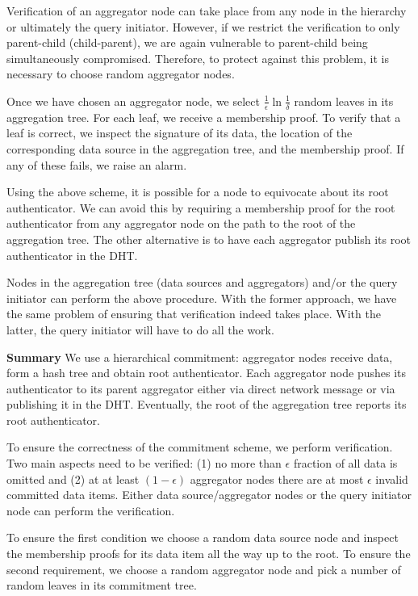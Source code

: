 \documentclass{article}
\begin{document}
Verification of an aggregator node can take place from any node
in the hierarchy or ultimately the query initiator. However, if
we restrict the verification to only parent-child (child-parent), we are again
vulnerable to parent-child being simultaneously
compromised. Therefore, to protect against this problem, it is
necessary to choose random aggregator nodes. 

Once we have chosen an aggregator node, we select
$\frac{1}{\epsilon}\ln{\frac{1}{\delta}}$ random leaves in its
aggregation tree. For each leaf, we receive a membership proof. To
verify that a leaf is correct, we inspect the signature of its data,
the location of the corresponding data source in the aggregation tree,
and the membership proof. If any of these fails, we raise an alarm.

Using the above scheme, it is possible for a node to equivocate about
its root authenticator. We can avoid this by requiring a membership
proof for the root authenticator from any aggregator node on the path
to the root of the aggregation tree. The other alternative is to have
each aggregator publish its root authenticator in the DHT.


Nodes in the aggregation tree (data sources and aggregators) and/or
the query initiator can perform the above procedure. With the
former approach, we have the same problem of ensuring that
verification indeed takes place. With the latter, the query initiator
will have to do all the work.


{\bf Summary}
We use a hierarchical commitment: aggregator nodes receive data, form
a hash tree and obtain root authenticator. Each aggregator node pushes
its authenticator to its parent aggregator either via direct network
message or via publishing it in the DHT. Eventually, the root of the
aggregation tree reports its root authenticator.

To ensure the correctness of the commitment scheme, we perform
verification. Two main aspects need to be verified: (1) no more than
$\epsilon$ fraction of all data is omitted and (2) at at least
$(1-\epsilon)$ aggregator nodes there are at most $\epsilon$
invalid committed data items. Either data source/aggregator nodes or
the query initiator node can perform the verification.

To ensure the first condition we choose a random data source node and
inspect the membership proofs for its data item all the way up to the
root. To ensure the second requirement, we choose a random aggregator
node and pick a number of random leaves in its commitment tree.
\end{document}
